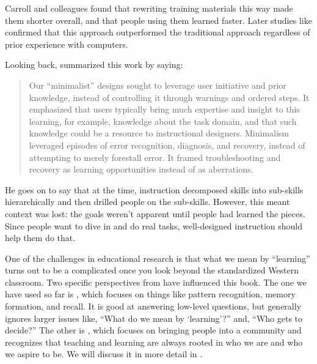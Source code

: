 Carroll and colleagues found that rewriting training materials this way
made them shorter overall, and that people using them learned faster.
Later studies like \cite{Lazo1993} confirmed that this approach
outperformed the traditional approach regardless of prior experience
with computers.

Looking back, \cite{Carr2014} summarized this work by saying:

\begin{quote}

Our ``minimalist'' designs sought to leverage user initiative and prior
knowledge, instead of controlling it through warnings and ordered
steps. It emphasized that users typically bring much expertise and
insight to this learning, for example, knowledge about the task
domain, and that such knowledge could be a resource to instructional
designers. Minimalism leveraged episodes of error recognition,
diagnosis, and recovery, instead of attempting to merely forestall
error. It framed troubleshooting and recovery as learning
opportunities instead of as aberrations.

\end{quote}

He goes on to say that at the time, instruction decomposed skills into
sub-skills hierarchically and then drilled people on the sub-skills.
However, this meant context was lost: the goals weren't apparent until
people had learned the pieces. Since people want to dive in and do real
tasks, well-designed instruction should help them do that.


One of the challenges in educational research is that
what we mean by ``learning'' turns out to be a complicated
once you look beyond the standardized Western classroom.
Two specific perspectives from 
have influenced this book.
The one we have used so far is ,
which focuses on things like pattern recognition, memory formation, and recall.
It is good at answering low-level questions,
but generally ignores larger issues like,
``What do we mean by `learning'?'' and, ``Who gets to decide?''
The other is ,
which focuses on bringing people into a community
and recognizes that
teaching and learning are always rooted in who we are and who we aspire to be.
We will discuss it in more detail in .

